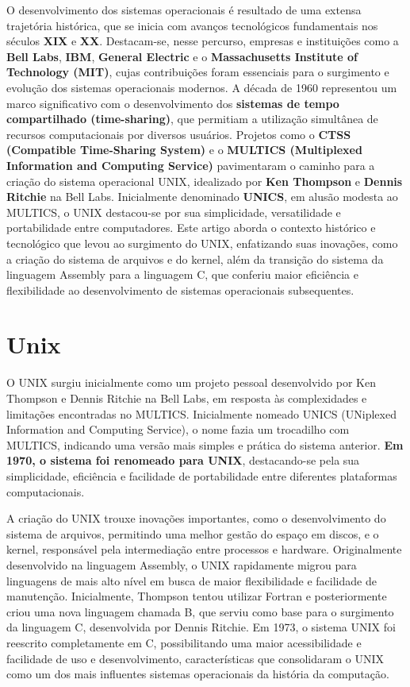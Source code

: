 \documentclass[12pt,oneside,a4paper]{abntex2}
\begin{document}
O desenvolvimento dos sistemas operacionais é resultado de uma extensa trajetória histórica, que se inicia com avanços tecnológicos fundamentais nos séculos \textbf{XIX} e \textbf{XX}. Destacam-se, nesse percurso, empresas e instituições como a \textbf{Bell Labs}, \textbf{IBM}, \textbf{General Electric} e o \textbf{Massachusetts Institute of Technology (MIT)}, cujas contribuições foram essenciais para o surgimento e evolução dos sistemas operacionais modernos. A década de 1960 representou um marco significativo com o desenvolvimento dos \textbf{sistemas de tempo compartilhado (time-sharing)}, que permitiam a utilização simultânea de recursos computacionais por diversos usuários. Projetos como o \textbf{CTSS (Compatible Time-Sharing System)} e o \textbf{MULTICS (Multiplexed Information and Computing Service)} pavimentaram o caminho para a criação do sistema operacional UNIX, idealizado por \textbf{Ken Thompson} e \textbf{Dennis Ritchie} na Bell Labs. Inicialmente denominado \textbf{UNICS}, em alusão modesta ao MULTICS, o UNIX destacou-se por sua simplicidade, versatilidade e portabilidade entre computadores. Este artigo aborda o contexto histórico e tecnológico que levou ao surgimento do UNIX, enfatizando suas inovações, como a criação do sistema de arquivos e do kernel, além da transição do sistema da linguagem Assembly para a linguagem C, que conferiu maior eficiência e flexibilidade ao desenvolvimento de sistemas operacionais subsequentes.

\section{Unix}

O UNIX surgiu inicialmente como um projeto pessoal desenvolvido por Ken Thompson e Dennis Ritchie na Bell Labs, em resposta às complexidades e limitações encontradas no MULTICS. Inicialmente nomeado UNICS (UNiplexed Information and Computing Service), o nome fazia um trocadilho com MULTICS, indicando uma versão mais simples e prática do sistema anterior. \textbf{Em 1970, o sistema foi renomeado para UNIX}, destacando-se pela sua simplicidade, eficiência e facilidade de portabilidade entre diferentes plataformas computacionais.

A criação do UNIX trouxe inovações importantes, como o desenvolvimento do sistema de arquivos, permitindo uma melhor gestão do espaço em discos, e o kernel, responsável pela intermediação entre processos e hardware. Originalmente desenvolvido na linguagem Assembly, o UNIX rapidamente migrou para linguagens de mais alto nível em busca de maior flexibilidade e facilidade de manutenção. Inicialmente, Thompson tentou utilizar Fortran e posteriormente criou uma nova linguagem chamada B, que serviu como base para o surgimento da linguagem C, desenvolvida por Dennis Ritchie. Em 1973, o sistema UNIX foi reescrito completamente em C, possibilitando uma maior acessibilidade e facilidade de uso e desenvolvimento, características que consolidaram o UNIX como um dos mais influentes sistemas operacionais da história da computação.
\end{document}
